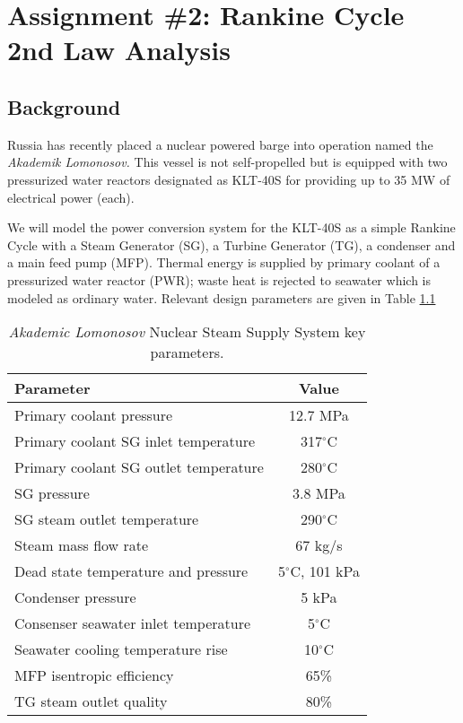 \chapter{Assignment \#2: Rankine Cycle 2nd Law Analysis}
\label{ch:ass2}

\section{Background}
Russia has recently placed a nuclear powered barge into operation named the \emph{Akademik Lomonosov.}  This vessel is not self-propelled but is equipped with two pressurized water reactors designated as KLT-40S for providing up to 35 MW of electrical power (each).

We will model the power conversion system for the KLT-40S as a simple Rankine Cycle with a Steam Generator (SG), a Turbine Generator (TG), a condenser and a main feed pump (MFP).  Thermal energy is supplied by primary coolant of a pressurized water reactor (PWR); waste heat is rejected to seawater which is modeled as ordinary water.  Relevant design parameters are given in Table \ref{tab:ass2}
\begin{table}
\begin{tabular}{l c}
\toprule
Parameter & Value \\
\midrule
Primary coolant pressure & 12.7 MPa \\
Primary coolant SG inlet temperature & 317$^{\circ}$C \\
Primary coolant SG outlet temperature & 280$^{\circ}$C \\
SG pressure & 3.8 MPa \\
SG steam outlet temperature & 290$^{\circ}$C \\
Steam mass flow rate & 67 kg/s \\
Dead state temperature and pressure & 5$^{\circ}$C, 101 kPa \\
Condenser pressure & 5 kPa\\
Consenser seawater inlet temperature & 5$^{\circ}$C \\
Seawater cooling temperature rise & 10$^{\circ}$C \\
MFP isentropic efficiency & 65\% \\
TG steam outlet quality & 80\% \\
\bottomrule
\end{tabular}
\caption{\emph{Akademic Lomonosov} Nuclear Steam Supply System key parameters.}
\label{tab:ass2}
\end{table}

